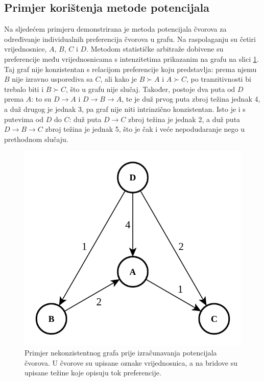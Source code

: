 \documentclass[lmodern, utf8, diplomski, numeric]{fer}
\begin{document}
  \subsection{Primjer korištenja metode potencijala}
  Na sljedećem primjeru demonstrirana je metoda potencijala čvorova za određivanje individualnih preferencija čvorova u grafu.
  Na raspolaganju su četiri vrijednosnice, $A$, $B$, $C$ i $D$.
  Metodom statističke arbitraže dobivene su preferencije među vrijednosnicama s intenzitetima prikazanim na grafu na slici \ref{fig:graph-eg-1}.
  Taj graf nije konzistentan s relacijom preferencije koju predstavlja: prema njemu $B$ nije izravno usporediva sa $C$, ali kako je $B \succ A$ i $A \succ C$, po tranzitivnosti bi trebalo biti i $B \succ C$, što u grafu nije slučaj.
  Također, postoje dva puta od $D$ prema $A$: to su $D \rightarrow A$ i $D \rightarrow B \rightarrow A$, te je duž prvog puta zbroj težina jednak 4, a duž drugog je jednak 3, pa graf nije niti intrinzično konzistentan.
  Isto je i s putevima od $D$ do $C$: duž puta $D \rightarrow C$ zbroj težina je jednak 2, a duž puta $D \rightarrow B \rightarrow C$ zbroj težina je jednak 5, što je čak i veće nepodudaranje nego u prethodnom slučaju.
  \begin{figure}[h]
    \centering
    \includegraphics[width=0.5\linewidth]{graphics/graph-eg-1.pdf}
    \caption{Primjer nekonzistentnog grafa prije izračunavanja potencijala čvorova.
    U čvorove su upisane oznake vrijednosnica, a na bridove su upisane težine koje opisuju tok preferencije.}
    \label{fig:graph-eg-1}
  \end{figure}
\end{document}

